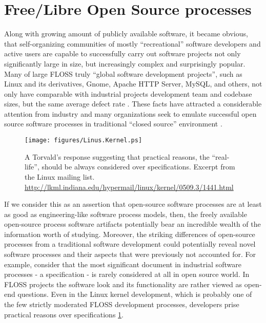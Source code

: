 \section{Free/Libre Open Source processes}\label{floss_processes}
Along with growing amount of publicly available software, it became obvious, that self-organizing communities of 
mostly ``recreational'' software developers and active users are capable to successfully carry out software projects 
not only significantly large in size, but increasingly complex and surprisingly popular.
Many of large FLOSS truly ``global software development projects'', such as Linux and its derivatives, 
Gnome, Apache HTTP Server, MySQL, and others, not only have comparable with industrial projects development team 
and codebase sizes, but the same average defect rate \cite{coverity2012}. 
These facts have attracted a considerable attention from industry and many organizations 
seek to emulate successful open source software processes in traditional ``closed source'' environment 
\cite{oss_virtual_organizations} \cite{oss_balance} \cite{oss_hp} \cite{oss_4industry}. 

\begin{figure}[ht!]
   \centering
   \texttt{[image: figures/Linus.Kernel.ps]}
   \caption{A Torvald's response suggesting that practical reasons, the ``real-life'', should be always considered 
   over specifications.
   Excerpt from the Linux mailing list. \url{http://lkml.indiana.edu/hypermail/linux/kernel/0509.3/1441.html}}
   \label{fig:kernel}
\end{figure}

If we consider this as an assertion that open-source software processes are at least as good as engineering-like 
software process models, then, the freely available open-source process software artifacts potentially bear an 
incredible wealth of the information worth of studying. Moreover, the striking differences of open-source processes 
from a traditional software development could potentially reveal novel software processes and their aspects that 
were previously not accounted for. 
For example, consider that the most significant document in industrial software processes - a specification - 
is rarely considered at all in open source world. In FLOSS projects the software look and its functionality are 
rather viewed as open-end questions. Even in the Linux kernel development, which is probably one of the few strictly 
moderated FLOSS development processes, developers prise practical reasons over specifications 
\ref{fig:kernel}.

